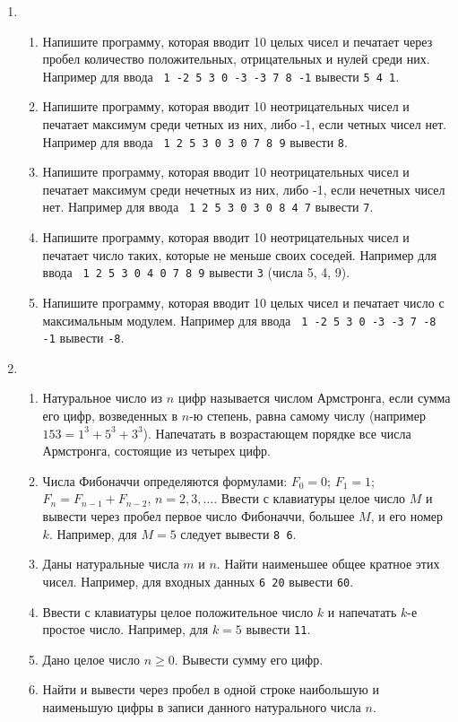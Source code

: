 \documentclass{article}
\begin{document}
\begin{enumerate}[label={}, leftmargin=0pt, itemindent=0pt]
\item
\begin{enumerate}[label=\arabic{enumi}.\arabic*.]
\item
Напишите программу, которая вводит 10 целых чисел и печатает через пробел количество положительных, отрицательных и нулей среди них. Например для ввода \texttt{ 1 -2 5 3 0 -3 -3 7 8 -1} вывести \texttt{5 4 1}.
\item
Напишите программу, которая вводит 10 неотрицательных чисел и печатает максимум среди четных из них, либо -1, если четных чисел нет. Например для ввода \texttt{ 1 2 5 3 0 3 0 7 8 9} вывести \texttt{8}.
\item
Напишите программу, которая вводит 10 неотрицательных чисел и печатает максимум среди нечетных из них, либо -1, если нечетных чисел нет. Например для ввода \texttt{ 1 2 5 3 0 3 0 8 4 7} вывести \texttt{7}.
\item
Напишите программу, которая вводит 10 неотрицательных чисел и печатает число таких, которые не меньше своих соседей. Например для ввода \texttt{ 1 2 5 3 0 4 0 7 8 9} вывести \texttt{3} (числа 5, 4, 9).
\item
Напишите программу, которая вводит 10 целых чисел и печатает число с максимальным модулем. Например для ввода \texttt{ 1 -2 5 3 0 -3 -3 7 -8 -1} вывести \texttt{-8}.
\end{enumerate}

\hrulefill
\item
\begin{enumerate}[label=\arabic{enumi}.\arabic*.]
\item
Натуральное число из $n$ цифр называется числом Армстронга, если сумма его цифр, возведенных в $n$-ю степень, равна самому числу (например $153=1^3+5^3+3^3$). Напечатать в возрастающем порядке все числа Армстронга, состоящие из четырех цифр.
\item
Числа Фибоначчи определяются формулами:
$F_0=0$; $F_1=1$; $F_n=F_{n-1}+F_{n-2}$, $n=2,3,\dots$. 
Ввести с клавиатуры целое число $M$ и вывести через пробел первое число Фибоначчи, большее $M$, и его номер $k$. Например, для $M=5$ следует вывести \texttt{8 6}.
\item
Даны натуральные числа $m$ и $n$. Найти наименьшее общее кратное этих чисел. Например, для входных данных \texttt{6 20} вывести \texttt{60}.
\item
Ввести с клавиатуры целое положительное число $k$ и напечатать $k$-е простое число. Например, для $k=5$ вывести \texttt{11}.
\item
Дано целое число $n\geqslant 0$. Вывести сумму его цифр.
\item
Найти и вывести через пробел в одной строке наибольшую и наименьшую цифры в записи данного натурального числа $n$.
\end{enumerate}
\hrulefill



\end{enumerate}
\end{document}

